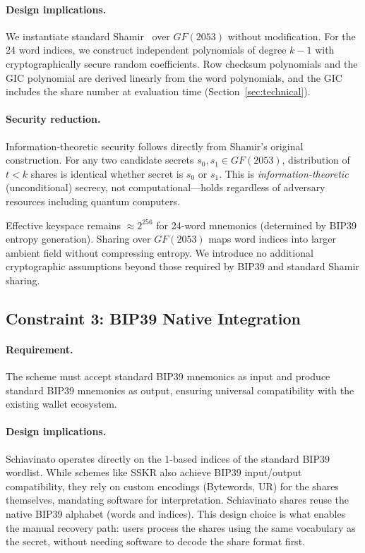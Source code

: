 \documentclass[11pt]{article}
\begin{document}
\paragraph{Design implications.} We instantiate standard Shamir~\cite{shamir1979} over $GF(2053)$ without modification. For the 24 word indices, we construct independent polynomials of degree $k-1$ with cryptographically secure random coefficients. Row checksum polynomials and the GIC polynomial are derived linearly from the word polynomials, and the GIC includes the share number at evaluation time (Section~\ref{sec:technical}).

\paragraph{Security reduction.} Information-theoretic security follows directly from Shamir's original construction. For any two candidate secrets $s_0, s_1 \in GF(2053)$, distribution of $t < k$ shares is identical whether secret is $s_0$ or $s_1$. This is \textit{information-theoretic} (unconditional) secrecy, not computational—holds regardless of adversary resources including quantum computers.

Effective keyspace remains $\approx 2^{256}$ for 24-word mnemonics (determined by BIP39 entropy generation). Sharing over $GF(2053)$ maps word indices into larger ambient field without compressing entropy. We introduce no additional cryptographic assumptions beyond those required by BIP39 and standard Shamir sharing.

\subsection{Constraint 3: BIP39 Native Integration}

\paragraph{Requirement.} The scheme must accept standard BIP39 mnemonics as input and produce standard BIP39 mnemonics as output, ensuring universal compatibility with the existing wallet ecosystem.

\paragraph{Design implications.} Schiavinato operates directly on the 1-based indices of the standard BIP39 wordlist. While schemes like SSKR also achieve BIP39 input/output compatibility, they rely on custom encodings (Bytewords, UR) for the shares themselves, mandating software for interpretation. Schiavinato shares reuse the native BIP39 alphabet (words and indices). This design choice is what enables the manual recovery path: users process the shares using the same vocabulary as the secret, without needing software to decode the share format first.
\end{document}
